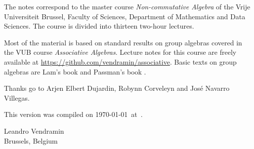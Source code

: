 \preface

The notes correspond to the master  
course \emph{Non-commutative Algebra} of the 
Vrije Universiteit Brussel, 
Faculty of Sciences, 
Department of Mathematics and Data Sciences. The course
is divided into thirteen two-hour lectures. 

Most of the material is based on standard 
results on group algebras covered in the VUB course \emph{Associative Algebras}. Lecture  
notes for this course are freely available at 
\url{https://github.com/vendramin/associative}. 
Basic texts on group algebras are Lam's book \cite{MR1125071}
and Passman's book \cite{MR798076}.

 
Thanks go to Arjen Elbert Dujardin, Robynn Corveleyn and
José Navarro Villegas. 

This version 
was compiled on \today~at~\currenttime.

\bigskip
\begin{flushright}
Leandro Vendramin\\Brussels, Belgium\par
\end{flushright}
